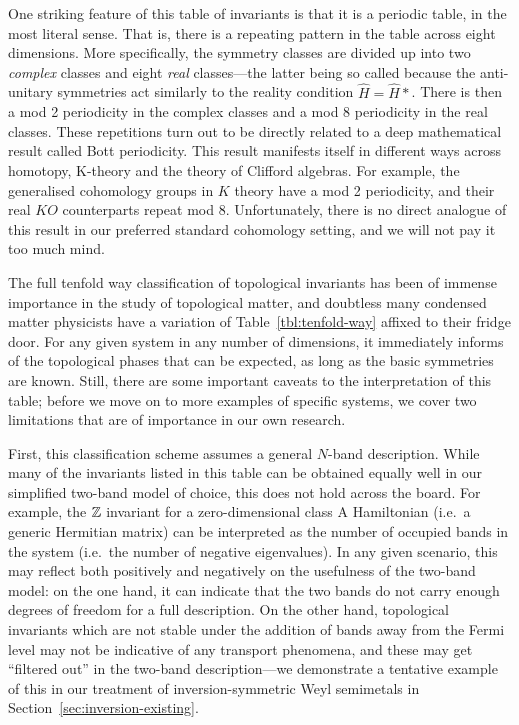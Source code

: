 One striking feature of this table of invariants is that it is a periodic table, in the most literal sense. That is, there is a repeating pattern in the table across eight dimensions. More specifically, the symmetry classes are divided up into two \emph{complex} classes and eight \emph{real} classes---the latter being so called because the anti-unitary symmetries act similarly to the reality condition $\hat{H} = \hat{H}*$. There is then a mod 2 periodicity in the complex classes and a mod 8 periodicity in the real classes. These repetitions turn out to be directly related to a deep mathematical result called Bott periodicity. This result manifests itself in different ways across homotopy, K-theory and the theory of Clifford algebras. For example, the generalised cohomology groups in $K$ theory have a mod 2 periodicity, and their real $KO$ counterparts repeat mod 8. Unfortunately, there is no direct analogue of this result in our preferred standard cohomology setting, and we will not pay it too much mind.

The full tenfold way classification of topological invariants has been of immense importance in the study of topological matter, and doubtless many condensed matter physicists have a variation of Table~\ref{tbl:tenfold-way} affixed to their fridge door. For any given system in any number of dimensions, it immediately informs of the topological phases that can be expected, as long as the basic symmetries are known. Still, there are some important caveats to the interpretation of this table; before we move on to more examples of specific systems, we cover two limitations that are of importance in our own research.

First, this classification scheme assumes a general $N$-band description. While many of the invariants listed in this table can be obtained equally well in our simplified two-band model of choice, this does not hold across the board. For example, the $\mathbb{Z}$ invariant for a zero-dimensional class A Hamiltonian (i.e.\ a generic Hermitian matrix) can be interpreted as the number of occupied bands in the system (i.e.\ the number of negative eigenvalues). In any given scenario, this may reflect both positively and negatively on the usefulness of the two-band model: on the one hand, it can indicate that the two bands do not carry enough degrees of freedom for a full description. On the other hand, topological invariants which are not stable under the addition of bands away from the Fermi level may not be indicative of any transport phenomena, and these may get ``filtered out'' in the two-band description---we demonstrate a tentative example of this in our treatment of inversion-symmetric Weyl semimetals in Section~\ref{sec:inversion-existing}.

